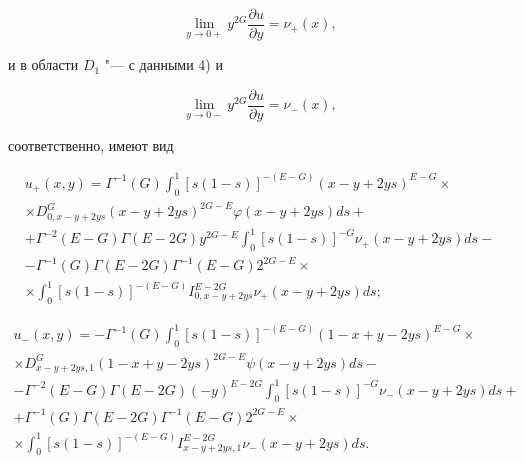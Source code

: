 \begin{equation}

\label{isririri:3.26}

\lim\limits_{y\to 0+}y^{2G}\frac{\partial u}{\partial y}=\nu_+(x),

\end{equation}

и в области $D_1$ "--- с данными 4) и

\begin{equation}

\label{isririri:3.27}

\lim\limits_{y\to 0-}y^{2G}\frac{\partial u}{\partial y}=\nu_-(x),

\end{equation}

соответственно, имеют вид

\begin{multline}\label{isririri:3.40}

u_+(x,y)=\Gamma^{-1}(G)\int _{0}^{1}[s(1-s)]^{-(E-G)}(x-y+2ys)^{E-G}\times\\

\times D^{G}_{0,x-y+2ys}(x-y+2ys)^{2G-E}\varphi(x-y+2ys)ds+\\

+\Gamma^{-2}(E-G)\Gamma(E-2G)y^{2G-E}\int _{0}^{1}[s(1-s)]^{-G}\nu_+(x-y+2ys)ds-\\

-\Gamma^{-1}(G)\Gamma(E-2G)\Gamma^{-1}(E-G)2^{2G-E} \times \\ \times \int _{0}^{1}[s(1-s)]^{-(E-G)}I^{E-2G}_{0,x-y+2ys}\nu_+(x-y+2ys)ds;

\end{multline}

\begin{multline}\label{isririri:3.33}

u_-(x,y)=-\Gamma^{-1}(G)\int _{0}^{1}[s(1-s)]^{-(E-G)}(1-x+y-2ys)^{E-G}\times\\

\times D^{G}_{x-y+2ys,1}(1-x+y-2ys)^{2G-E}\psi(x-y+2ys)ds-\\

-\Gamma^{-2}(E-G)\Gamma(E-2G)(-y)^{E-2G}\int _{0}^{1}[s(1-s)]^{-G}\nu_-(x-y+2ys)ds+\\

+\Gamma^{-1}(G)\Gamma(E-2G)\Gamma^{-1}(E-G)2^{2G-E}  \times \\ \times\int _{0}^{1}[s(1-s)]^{-(E-G)}I^{E-2G}_{x-y+2ys,1}\nu_-(x-y+2ys)ds.

\end{multline}

